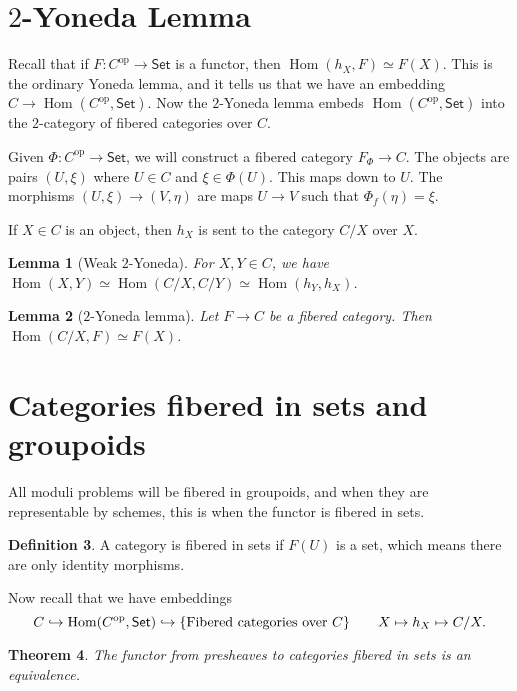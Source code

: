 \documentclass[leqno, openany]{memoir}
\newtheorem{thm}{Theorem}[section]
\newtheorem{lem}[thm]{Lemma}
\theoremstyle{definition}
\newtheorem{defn}[thm]{Definition}
\theoremstyle{remark}
\theoremstyle{plain}
\theoremstyle{definition}
\theoremstyle{remark}
\newcommand{\mr}[1]{\mathrm{#1}}
\newcommand{\ms}[1]{\mathsf{#1}}
\DeclareMathOperator{\Hom}{Hom}
\begin{document}
\section{$2$-Yoneda Lemma}%
\label{sec:_2_yoneda_lemma}

Recall that if $F \colon C^{\mr{op}} \to \ms{Set}$ is a functor, then $\Hom(h_X, F) \simeq F(X)$. This is the ordinary Yoneda lemma, and it tells us that we have an embedding $C \to \Hom(C^{\mr{op}}, \ms{Set})$. Now the $2$-Yoneda lemma embeds $\Hom(C^{\mr{op}}, \ms{Set})$ into the $2$-category of fibered categories over $C$.

Given $\Phi \colon C^{\mr{op}} \to \ms{Set}$, we will construct a fibered category $F_{\Phi} \to C$. The objects are pairs $(U, \xi)$ where $U \in C$ and $\xi \in \Phi(U)$. This maps down to $U$. The morphisms $(U, \xi) \to (V, \eta)$ are maps $U \to V$ such that $\Phi_f(\eta) = \xi$.

If $X \in C$ is an object, then $h_X$ is sent to the category $C/X$ over $X$.

\begin{lem}[Weak $2$-Yoneda]
    For $X,Y \in C$, we have $\Hom(X,Y) \simeq \Hom(C/X, C/Y) \simeq \Hom(h_Y, h_X)$.
\end{lem}

\begin{lem}[$2$-Yoneda lemma]
    Let $F \to C$ be a fibered category. Then $\Hom(C/X, F) \simeq F(X)$.
\end{lem}

\section{Categories fibered in sets and groupoids}%
\label{sec:categories_fibered_in_sets_and_groupoids}

All moduli problems will be fibered in groupoids, and when they are representable by schemes, this is when the functor is fibered in sets.

\begin{defn}
    A category is fibered in sets if $F(U)$ is a set, which means there are only identity morphisms.
\end{defn}

Now recall that we have embeddings
\[ C \hookrightarrow \Hom(C^{\mr{op}}, \ms{Set}) \hookrightarrow \qty{\text{Fibered categories over } C} \qquad X \mapsto h_X \mapsto C/X. \]

\begin{thm}
    The functor from presheaves to categories fibered in sets is an equivalence. 
\end{thm}
\end{document}
